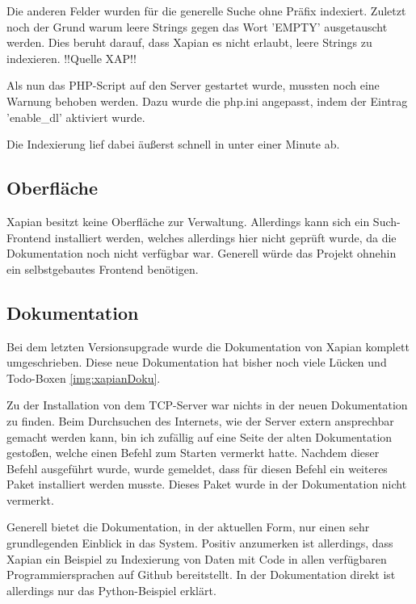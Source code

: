 Die anderen Felder wurden für die generelle Suche ohne Präfix indexiert. Zuletzt noch der Grund warum leere Strings gegen das Wort 'EMPTY' ausgetauscht werden. Dies beruht darauf, dass Xapian es nicht erlaubt, leere Strings zu indexieren. !!Quelle XAP!!

Als nun das PHP-Script auf den Server gestartet wurde, mussten noch eine Warnung behoben werden. Dazu wurde die php.ini angepasst, indem der Eintrag 'enable\_dl' aktiviert wurde. 

Die Indexierung lief dabei äußerst schnell in unter einer Minute ab.

\subsection{Oberfläche}

Xapian besitzt keine Oberfläche zur Verwaltung. Allerdings kann sich ein Such-Frontend installiert werden, welches allerdings hier nicht geprüft wurde, da die Dokumentation noch nicht verfügbar war. Generell würde das Projekt ohnehin ein selbstgebautes Frontend benötigen.

\subsection{Dokumentation}

Bei dem letzten Versionsupgrade wurde die Dokumentation von Xapian komplett umgeschrieben. Diese neue Dokumentation hat bisher noch viele Lücken und Todo-Boxen \ref{img:xapianDoku}.

Zu der Installation von dem TCP-Server war nichts in der neuen Dokumentation zu finden. Beim Durchsuchen des Internets, wie der Server extern ansprechbar gemacht werden kann, bin ich zufällig auf eine Seite der alten Dokumentation gestoßen, welche einen Befehl zum Starten vermerkt hatte. Nachdem dieser Befehl ausgeführt wurde, wurde gemeldet, dass für diesen Befehl ein weiteres Paket installiert werden musste. Dieses Paket wurde in der Dokumentation nicht vermerkt. 

Generell bietet die Dokumentation, in der aktuellen Form, nur einen sehr grundlegenden Einblick in das System. Positiv anzumerken ist allerdings, dass Xapian ein Beispiel zu Indexierung von Daten mit Code in allen verfügbaren Programmiersprachen auf Github bereitstellt. In der Dokumentation direkt ist allerdings nur das Python-Beispiel erklärt.

